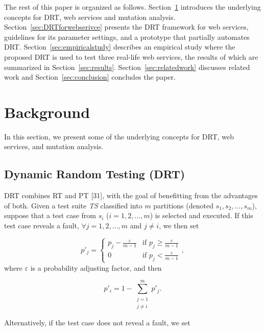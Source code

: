 \documentclass[10pt,journal,compsoc]{IEEEtran}
\begin{document}
The rest of this paper is organized as follows.
Section~\ref{sec:background} introduces the underlying concepts for DRT, web services and mutation analysis.
Section~\ref{sec:DRTforwebserivce} presents the DRT framework for web services, guidelines for its parameter settings, and a prototype that partially automates DRT.
Section~\ref{sec:empiricalstudy} describes an empirical study where the proposed DRT is used to test three real-life web services, the results of which are summarized in Section~\ref{sec:results}.
Section~\ref{sec:relatedwork} discusses related work and Section~\ref{sec:conclusion} concludes the paper.

\section{Background}
\label{sec:background}

In this section, we present some of the underlying concepts for DRT, web services, and mutation analysis.

\subsection{Dynamic Random Testing (DRT)}
\label{sec:DRTStrategy}

DRT combines RT and PT [31], with the goal of benefitting from the advantages of both.
Given a test suite \emph{TS} classified into $m$ partitions (denoted $s_1, s_2, \ldots, s_m$),  suppose that a test case from $s_i$ ($i = 1, 2, \ldots, m$) is selected and executed.
If this test case reveals a fault, $\forall j = 1, 2, \ldots, m$ and $j \neq i$, we then set

\begin{equation}
\label{eq:DRThitJ}
p'_j =
\begin{cases}
p_j - \displaystyle\frac{\varepsilon}{m-1} & \text{if } p_j \geq \displaystyle\frac{\varepsilon}{m-1} \\
0 & \text{if } p_j < \displaystyle\frac{\varepsilon}{m-1}
\end{cases},
\end{equation}
where $\varepsilon$ is a probability adjusting factor, and then

\begin{equation}
\label{eq:DRThitI}
  p'_i = 1 - \sum_{\substack{j = 1 \\ j \neq i}}^m p'_j.
\end{equation}

Alternatively, if the test case does not reveal a fault, we set
\end{document}
